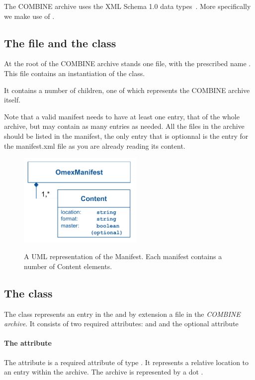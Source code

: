 The COMBINE archive uses the XML Schema 1.0 data types~\citep{biron:2000}.
More specifically we make use of .


\subsection{The  file and the  class}
\label{manifest-class}

At the root of the COMBINE archive stands one file, with the prescribed name . This file contains an instantiation of the \OmexManifest class. 

It contains a number of \Content children, one of which represents the COMBINE archive itself. 

Note that a valid manifest needs to have at least one entry, that of the whole archive, but may 
contain as many entries as needed. All the files in the archive should be listed in the manifest, the only
entry that is optionnal is the entry for the manifest.xml file as you are already reading its content.

\begin{figure}[h!]
  \centering
  \includegraphics[width=6cm]{images/OmexManifest.pdf}\\
  \caption{A UML representation of the Manifest. Each manifest contains a number
	of Content elements.}
  \label{fig:combine_uml}
\end{figure}

\subsection{The  class}
\label{content-class}
The \Content class represents an entry in the \OmexManifest and by 
extension a file in the \textit{COMBINE archive}. It consists of two 
required attributes:  and  and the 
optional attribute  

\paragraph{The  attribute}
The  attribute is a required attribute of type 
. It represents a relative location to an entry within the 
archive. The archive is represented by a dot . 

